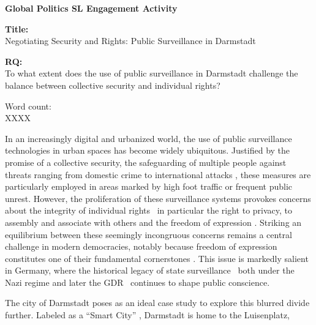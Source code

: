 \documentclass[12pt]{article}
\begin{document}
	
	\begin{titlepage}
		\centering
		
		\textbf{Global Politics SL \textemdash Engagement Activity}
		
		\vspace*{4cm}
		
		\textbf{Title:}\\
		Negotiating Security and Rights: Public Surveillance in Darmstadt
		
		\vspace{1cm}
		
		\textbf{RQ:}\\
		To what extent does the use of public surveillance in Darmstadt challenge the balance between collective security and individual rights?
		
		\vspace{4cm}
		
		Word count:\\
		XXXX
		
		\vfill
	\end{titlepage}
	
	
	In an increasingly digital and urbanized world, the use of public surveillance technologies in urban spaces has become widely ubiquitous. Justified by the promise of a collective security, the safeguarding of multiple people against threats ranging from domestic crime to international attacks \parencites{noauthor_security_2025}{noauthor_collective_2025}, these measures are particularly employed in areas marked by high foot traffic or frequent public unrest. However, the proliferation of these surveillance systems provokes concerns about the integrity of individual rights \textemdash\ in particular the right to privacy, to assembly and associate with others and the freedom of expression \parencite{nandy2023}. Striking an equilibrium between these seemingly incongruous concerns remains a central challenge in modern democracies, notably because freedom of expression constitutes one of their fundamental cornerstones \parencite{noauthor_special_nodate}. This issue is markedly salient in Germany, where the historical legacy of state surveillance \textemdash\ both under the Nazi regime \parencite{mdrde_uberwachung_nodate} and later the GDR \parencite{lichter_loeffler_siegloch2016} \textemdash\ continues to shape public conscience.
	
	The city of Darmstadt poses as an ideal case study to explore this blurred divide further. Labeled as a ``Smart City'' \parencite{noauthor_smart_nodate}, Darmstadt is home to the Luisenplatz, 
	
	
	
	
	\clearpage
	
	\printbibliography
	
\end{document}
